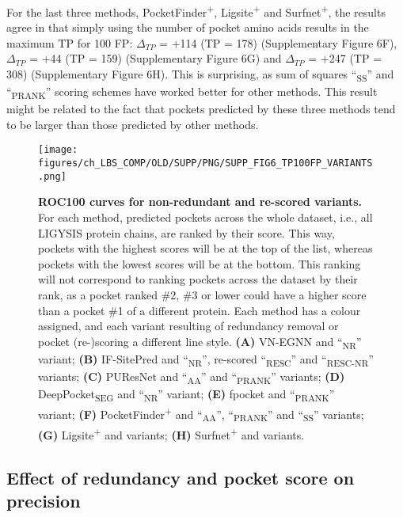 For the last three methods, PocketFinder\textsuperscript{+}, Ligsite\textsuperscript{+} and Surfnet\textsuperscript{+}, the results agree in that simply using the number of pocket amino acids results in the maximum TP for 100 FP: $\Delta_{TP}$ = +114 (TP = 178) (Supplementary Figure 6F), $\Delta_{TP}$ = +44 (TP = 159) (Supplementary Figure 6G) and $\Delta_{TP}$ = +247 (TP = 308) (Supplementary Figure 6H). This is surprising, as sum of squares ``\textsubscript{SS}'' and ``\textsubscript{PRANK}'' scoring schemes have worked better for other methods. This result might be related to the fact that pockets predicted by these three methods tend to be larger than those predicted by other methods.

\begin{figure}[ht!]
    \centering
    \texttt{[image: figures/ch\_LBS\_COMP/OLD/SUPP/PNG/SUPP\_FIG6\_TP100FP\_VARIANTS.png]}
    \caption[ROC100 curves for non-redundant and re-scored variants]{\textbf{ROC100 curves for non-redundant and re-scored variants.} For each method, predicted pockets across the whole dataset, i.e., all LIGYSIS protein chains, are ranked by their score. This way, pockets with the highest scores will be at the top of the list, whereas pockets with the lowest scores will be at the bottom. This ranking will not correspond to ranking pockets across the dataset by their rank, as a pocket ranked \#2, \#3 or lower could have a higher score than a pocket \#1 of a different protein. Each method has a colour assigned, and each variant resulting of redundancy removal or pocket (re-)scoring a different line style. \textbf{(A)} VN-EGNN and ``\textsubscript{NR}'' variant; \textbf{(B)} IF-SitePred and ``\textsubscript{NR}'', re-scored ``\textsubscript{RESC}'' and ``\textsubscript{RESC-NR}'' variants; \textbf{(C)} PUResNet and ``\textsubscript{AA}'' and ``\textsubscript{PRANK}'' variants; \textbf{(D)} DeepPocket\textsubscript{SEG} and ``\textsubscript{NR}'' variant; \textbf{(E)} fpocket and ``\textsubscript{PRANK}'' variant; \textbf{(F)} PocketFinder\textsuperscript{+} and ``\textsubscript{AA}'', ``\textsubscript{PRANK}'' and ``\textsubscript{SS}'' variants; \textbf{(G)} Ligsite\textsuperscript{+} and variants; \textbf{(H)} Surfnet\textsuperscript{+} and variants.}
    \label{fig:pocket_ROC100_variants}
\end{figure}

\FloatBarrier

\subsection{Effect of redundancy and pocket score on precision}

